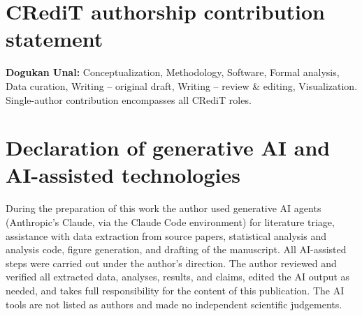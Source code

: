 \section*{CRediT authorship contribution statement}
\textbf{Dogukan Unal:} Conceptualization, Methodology, Software, Formal analysis, Data curation,
Writing -- original draft, Writing -- review \& editing, Visualization. Single-author contribution encompasses all CRediT roles.

\section*{Declaration of generative AI and AI-assisted technologies}
During the preparation of this work the author used generative AI agents (Anthropic's Claude, via
the Claude Code environment) for literature triage, assistance with data extraction from source
papers, statistical analysis and analysis code, figure generation, and drafting of the manuscript.
All AI-assisted steps were carried out under the author's direction. The author reviewed and verified
all extracted data, analyses, results, and claims, edited the AI output as needed, and takes full
responsibility for the content of this publication. The AI tools are not listed as authors and made
no independent scientific judgements.
